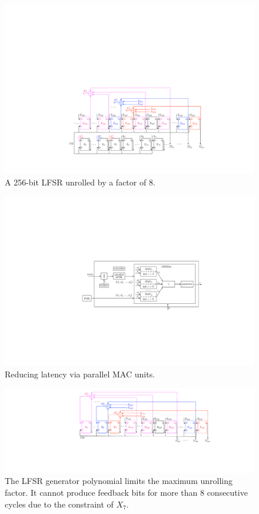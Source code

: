 \begin{figure}[t!]
\centering
\includegraphics[width = 1.0\linewidth]{./figs/lfsr_unrolled_compressed}
\caption{A 256-bit LFSR unrolled by a factor of 8.}
\label{fig:lfsr_unrolled}
\end{figure}

\begin{figure}[t!]
\centering
\includegraphics[width = 1.0\linewidth]{./figs/lpuf_p2_large}
\caption{Reducing latency via parallel MAC units.}
\label{fig:lpuf_p2}
\end{figure}

\begin{figure}[t!]
\centering
\includegraphics[width = 1.0\linewidth]{./figs/lfsr_unroll_limit_compressed}
\caption{The LFSR generator polynomial limits the maximum unrolling factor. It cannot produce feedback bits for more than $8$ consecutive cycles due to the constraint of $X_{7}$.}
\label{fig:lfsr_unrol_limit}
\end{figure}

